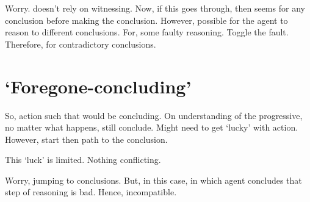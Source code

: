 \begin{note}
  \color{red}
  Worry.
   doesn't rely on witnessing.
  Now, if this goes through, then seems \support{} for any conclusion before making the conclusion.
  However, possible for the agent to reason to different conclusions.
  For, some faulty reasoning.
  Toggle the fault.
  Therefore, \support{} for contradictory conclusions.
\end{note}







\section{`Foregone-concluding'}
\label{sec:fc-progressive}

\begin{note}
  So, action such that would be concluding.
  On understanding of the progressive, no matter what happens, still conclude.
  Might need to get `lucky' with action.
  However, start then path to the conclusion.

  This `luck' is limited.
  Nothing conflicting.
\end{note}

\begin{note}
  Worry, jumping to conclusions.
  But, in this case, \pevent{} in which agent concludes that step of reasoning is bad.
  Hence, incompatible.
\end{note}

